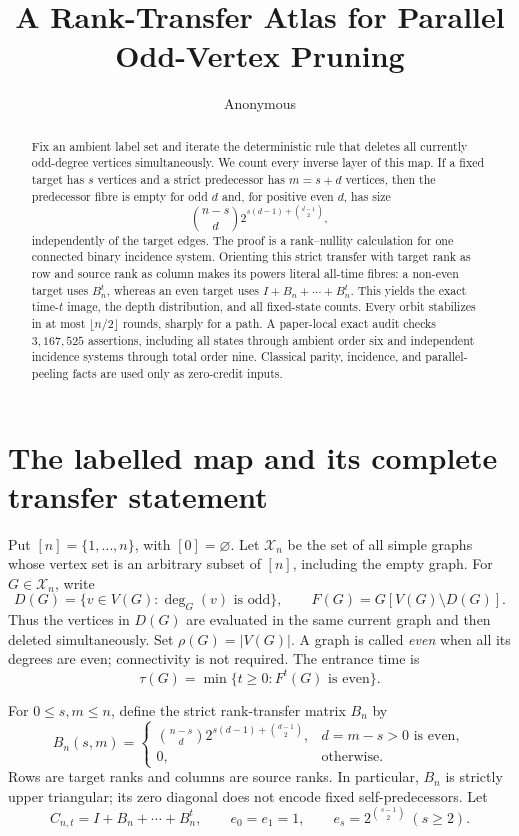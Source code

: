 \documentclass[a4paper,10pt]{amsart}
\title[Parallel odd-vertex pruning]{A Rank-Transfer Atlas for Parallel Odd-Vertex Pruning}
\author{Anonymous}
\date{}
\theoremstyle{remark}
\newcommand{\X}{\mathcal X}
\newcommand{\rank}{\rho}
\begin{document}
\begin{abstract}
Fix an ambient label set and iterate the deterministic rule that deletes all
currently odd-degree vertices simultaneously.  We count every inverse layer
of this map.  If a fixed target has $s$ vertices and a strict predecessor has
$m=s+d$ vertices, then the predecessor fibre is empty for odd $d$ and, for
positive even $d$, has size
\[
 \binom{n-s}{d}
 2^{s(d-1)+\binom{d-1}{2}},
\]
independently of the target edges.  The proof is a rank--nullity calculation
for one connected binary incidence system.  Orienting this strict transfer
with target rank as row and source rank as column makes its powers literal
all-time fibres: a non-even target uses $B_n^t$, whereas an even target uses
$I+B_n+\cdots+B_n^t$.  This yields the exact time-$t$ image, the depth
distribution, and all fixed-state counts.  Every orbit stabilizes in at most
$\lfloor n/2\rfloor$ rounds, sharply for a path.  A paper-local exact audit
checks $3{,}167{,}525$ assertions, including all states through ambient order
six and independent incidence systems through total order nine.  Classical
parity, incidence, and parallel-peeling facts are used only as zero-credit
inputs.
\end{abstract}

\maketitle

\section{The labelled map and its complete transfer statement}\label{sec:setup}

Put $[n]=\{1,\ldots,n\}$, with $[0]=\varnothing$.  Let $\X_n$ be the set of
all simple graphs whose vertex set is an arbitrary subset of $[n]$, including
the empty graph.  For $G\in\X_n$, write
\[
 D(G)=\{v\in V(G):\deg_G(v)\text{ is odd}\},\qquad
 F(G)=G[V(G)\setminus D(G)].                         \tag{1.1}\label{eq:update}
\]
Thus the vertices in $D(G)$ are evaluated in the same current graph and then
deleted simultaneously.  Set $\rank(G)=|V(G)|$.  A graph is called
\emph{even} when all its degrees are even; connectivity is not required.
The entrance time is
\[
 \tau(G)=\min\{t\geq0:F^t(G)\text{ is even}\}.
\]

For $0\leq s,m\leq n$, define the strict rank-transfer matrix $B_n$ by
\begin{equation}\label{eq:B}
 B_n(s,m)=
 \begin{cases}
 \displaystyle \binom{n-s}{d}
 2^{s(d-1)+\binom{d-1}{2}},
     & d=m-s>0\text{ is even},\\[4pt]
 0,  & \text{otherwise}.
 \end{cases}
\end{equation}
Rows are target ranks and columns are source ranks.  In particular, $B_n$ is
strictly upper triangular; its zero diagonal does not encode fixed
self-predecessors.  Let
\[
 C_{n,t}=I+B_n+\cdots+B_n^t,
 \qquad
 e_0=e_1=1,\qquad e_s=2^{\binom{s-1}{2}}\ (s\geq2).
\]
\end{document}
